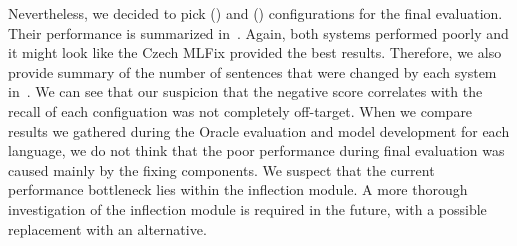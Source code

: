 \begin{table}[t]
\centering
\small
{}
\caption[Automatic evaluation of the German error detection module]{
    Automatic evaluation of the error detection module using different voting methods to interpret output
of mutliple models using BLEU metric. Values are multiplied by 100 for easier reading,
and the relative improvement over the baseline MT output.
Performance of the
Oracle classifier is provided for comparison.
The best model for each dataset is printed in bold.
}
\label{markonly_de-summary}
\end{table}

Nevertheless, we decided to pick  () and  () configurations
for the final evaluation. Their performance is summarized in~. Again, both
systems performed poorly and it might look like the Czech MLFix provided the best results. Therefore,
we also provide summary of the number of sentences that were changed by each system in~.
We can see that our suspicion that the negative score correlates with the recall of each configuation was not
completely off-target. When we compare results we gathered during the Oracle evaluation and model
development for each language, we do not think that the poor performance during final evaluation was
caused mainly by the fixing
components. We suspect that the current performance bottleneck lies within the inflection module.
A more thorough investigation of the inflection module is required in the future, with a possible
replacement with an alternative.

